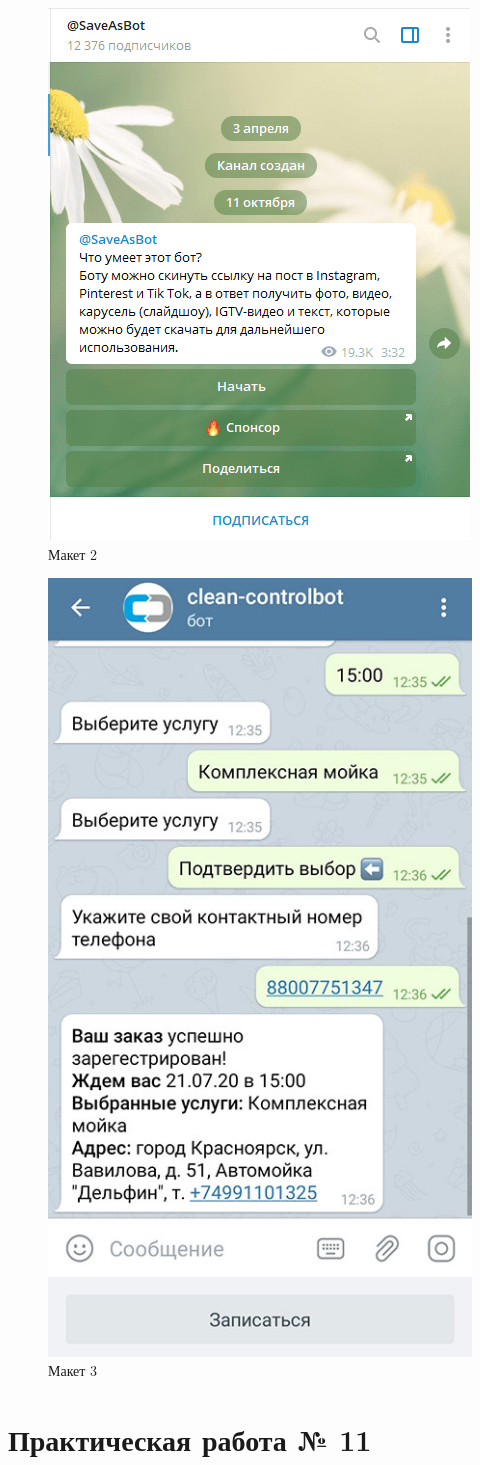 \documentclass[a4paper,14pt]{extarticle}
\begin{document}
\begin{figure}[h!]
	\centering
	\includegraphics[width=0.5\linewidth]{images/mokups/saver}
	\caption{Макет 2}
	\label{fig:saver}
\end{figure}

\begin{figure}[h!]
	\centering
	\includegraphics[width=0.4\linewidth]{images/mokups/wash}
	\caption{Макет 3}
	\label{fig:wash}
\end{figure}
\clearpage

\section{Практическая работа № 11}

\end{document}
